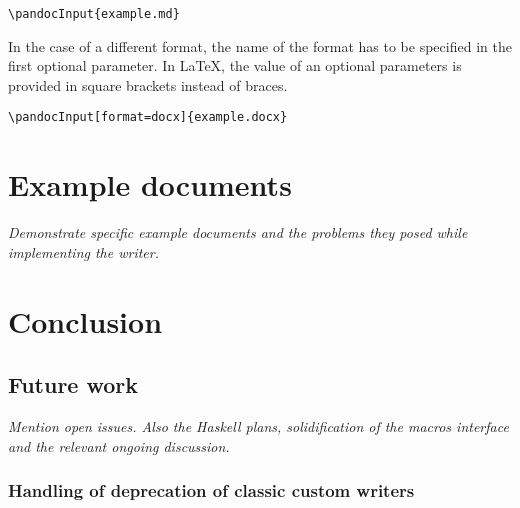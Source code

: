 \documentclass[
  digital,     %
  oneside,     %
  nosansbold,  %
  nocolorbold, %
  lof,         %
  nolot,       %
]{fithesis4}
\begin{document}
\noindent
\lstset{language=[LaTeX]TeX}
\begin{lstlisting}
\pandocInput{example.md}
\end{lstlisting}

\noindent
In the case of a different format, the name of the format has to be specified in the first optional parameter. In \LaTeX{}, the value of an optional parameters is provided in square brackets instead of braces.

\noindent
\lstset{language=[LaTeX]TeX}
\begin{lstlisting}
\pandocInput[format=docx]{example.docx}
\end{lstlisting}

\chapter{Example documents}
\emph{Demonstrate specific example documents and the problems they posed while implementing the writer.} \label{fig:html-browsers-typeset}

% 


\chapter{Conclusion}
\section{Future work}
\emph{Mention open issues. Also the Haskell plans, solidification of the macros interface and the relevant ongoing discussion.}

\subsection{Handling of deprecation of classic custom writers}
\end{document}
